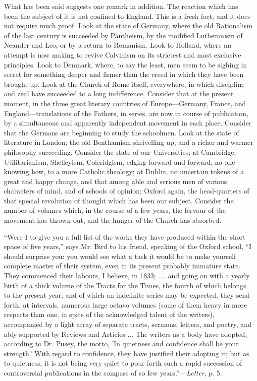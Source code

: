What has been said suggests one remark in
addition. The reaction which has been the subject of it is not
confined to England. This is a fresh fact, and it does not require
much proof. Look at the state of Germany, where the old Rationalism of
the last century is succeeded by Pantheism, by the modified
Lutheranism of Neander and Leo, or by a return to Romanism. Look to
Holland, where an attempt is now making to revive Calvinism on its
strictest and most exclusive principles. Look to Denmark, where, to
say the least, men seem to be sighing in secret for something deeper
and firmer than the creed in which they have been brought up. Look at the Church of Rome itself, everywhere, in which discipline and
zeal have succeeded to a long indifference. Consider that at the
present moment, in the three great literary countries of
Europe—Germany, France, and England—translations of the Fathers,
in series, are now in course of publication, by a simultaneous and
apparently independent movement in each place. Consider that the
Germans are beginning to study the schoolmen. Look at the state of
literature in London; the old Benthamism shrivelling up, and a richer
and warmer philosophy succeeding. Consider the state of our
Universities; at Cambridge, Utilitarianism, Shelleyism, Coleridgism,
edging forward and forward, no one knowing how, to a more Catholic
theology; at Dublin, no uncertain tokens of a great and happy change,
and that among able and serious men of various characters of mind, and
of schools of opinion; Oxford again, the head-quarters of that special
revolution of thought which has been our subject. Consider the number
of volumes which, in the course of a few years, the fervour of the
movement has thrown out, and the hunger of the Church has absorbed.

``Were
I to give you a full list of the works they have produced within the
short space of five years,'' says Mr. Bird to his friend, speaking of
the Oxford school, ``I should surprise you: you would see what a task
it would be to make yourself complete master of their system, even in
its present probably immature state. They commenced their labours, I
believe, in 1833; .... and going on with a yearly birth of a thick
volume of the Tracts for the Times, the fourth of which belongs to the
present year, and of which an indefinite series may be expected, they
send forth, at intervals, numerous large octavo volumes (some of them
heavy in more respects than one, in spite of the acknowledged talent
of the writers), accompanied by a light array of separate tracts,
sermons, letters, and poetry, and ably supported by Reviews and Articles ... The
writers as a body have adopted, according to Dr. Pusey, the motto, 'In
quietness and confidence shall be your strength.' With regard to
confidence, they have justified their adopting it; but as to
quietness, it is not being very quiet to pour forth such a rapid
succession of controversial publications in the compass of so few
years.''—\emph{Letter}, p. 5.

